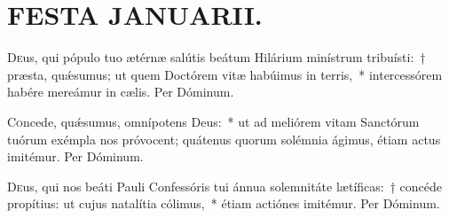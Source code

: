 \documentclass[vesperale_romanum.tex]{subfiles}
\begin{document}
\section[Festa Januarii]{FESTA JANUARII.}


\duplexmtv


\oratio

\lettrine{D}{e}us, qui pópulo tuo ætérnæ salútis beátum Hilárium minístrum tribuísti:~† præsta, quǽsumus; ut quem Doctórem vitæ habúimus in terris,~* intercessórem habére mereámur in cælis.
Per Dóminum.


\oratio

\lettrine{C}{o}ncede, quǽsumus, omnípotens Deus:~* ut ad meliórem vitam Sanctórum tuórum exémpla nos próvocent; quátenus quorum solémnia ágimus, étiam actus imitémur.
Per Dóminum.

\myrule


\duplexmtv

\oratio

\lettrine{D}{e}us, qui nos beáti Pauli Confessóris tui ánnua solemnitáte lætíficas:~† concéde propítius: ut cujus natalítia cólimus,~* étiam actiónes imitémur. Per Dóminum.




\oratio
\end{document}
